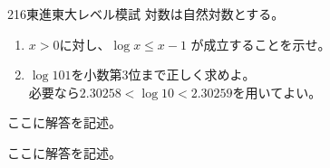 \begin{thm}{216}{}{東進東大レベル模試}
 対数は自然対数とする。
 \begin{enumerate}
  \item $x>0$に対し、$\log x \le x-1$ が成立することを示せ。
  \item $\log 101$を小数第3位まで正しく求めよ。 \\ 必要なら$2.30258<\log 10 <2.30259$を用いてよい。
 \end{enumerate}
\end{thm}

ここに解答を記述。

ここに解答を記述。